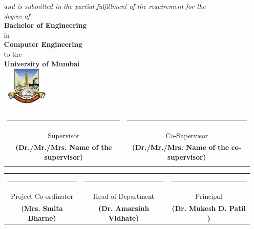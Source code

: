 \begin{center}
\vspace{0.1in}
{\large \it and is submitted in the partial fulfillment of the requirement for the}\\
{\large \it degree of}\\
\vspace{0.1in}
{\large \bf {Bachelor of Engineering}}\\
\vspace{-0.1in}
{\large in} \\
\vspace{-0.1in}
{\large \bf {Computer Engineering}}\\
\vspace{-0.1in}
{\large to the} \\
\vspace{-0.1in}
{\large \bf University of Mumbai}\\
\includegraphics[width=25mm, height=19mm,keepaspectratio]{univ}

\vspace{-0.1in}

\end{center}
\vspace{-0.2in}
\begin{center}
\begin{tabular}{cc}

      \noindent\rule{4cm}{0.5pt} & \hspace{0.5in}\noindent\rule{4cm}{0.5pt} \\
      \small{Supervisor} & \hspace{0.5in}\small{Co-Supervisor}\\
   \small{\textbf{(Dr./Mr./Mrs. Name of the supervisor)}}& \hspace{0.5in}\small{\textbf{(Dr./Mr./Mrs. Name of the co-supervisor)}}\\
   \vspace{0.2in}
    \end{tabular}

\begin{tabular}{ccc}
      \noindent\rule{4cm}{0.5pt} & \hspace{0.5in}\noindent\rule{4cm}{0.5pt} & \hspace{0.12in}\noindent\rule{4cm}{0.5pt} \\
      \small{Project Co-ordinator} & \hspace{0.5in}\small{Head of Department} & \hspace{0.12in}\small{Principal} \\
   \small{\textbf{(Mrs. Smita Bharne)}}& \hspace{0.5in}\small{\textbf{(Dr. Amarsinh Vidhate)}} & \hspace{0.25in}\small{\textbf{(Dr. Mukesh D. Patil )}} \\
    \end{tabular}
\end{center}




